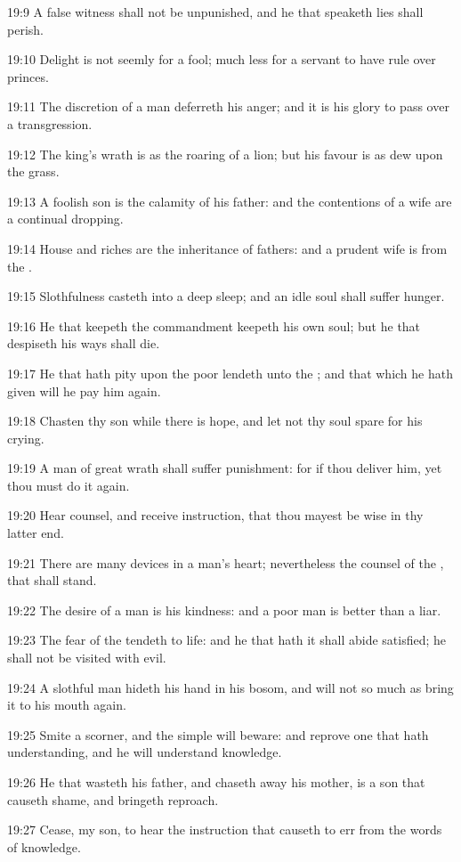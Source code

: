 19:9 A false witness shall not be unpunished, and he that speaketh
lies shall perish.

19:10 Delight is not seemly for a fool; much less for a servant to
have rule over princes.

19:11 The discretion of a man deferreth his anger; and it is his glory
to pass over a transgression.

19:12 The king's wrath is as the roaring of a lion; but his favour is
as dew upon the grass.

19:13 A foolish son is the calamity of his father: and the contentions
of a wife are a continual dropping.

19:14 House and riches are the inheritance of fathers: and a prudent
wife is from the \LORD.

19:15 Slothfulness casteth into a deep sleep; and an idle soul shall
suffer hunger.

19:16 He that keepeth the commandment keepeth his own soul; but he
that despiseth his ways shall die.

19:17 He that hath pity upon the poor lendeth unto the \LORD; and that
which he hath given will he pay him again.

19:18 Chasten thy son while there is hope, and let not thy soul spare
for his crying.

19:19 A man of great wrath shall suffer punishment: for if thou
deliver him, yet thou must do it again.

19:20 Hear counsel, and receive instruction, that thou mayest be wise
in thy latter end.

19:21 There are many devices in a man's heart; nevertheless the
counsel of the \LORD, that shall stand.

19:22 The desire of a man is his kindness: and a poor man is better
than a liar.

19:23 The fear of the \LORD tendeth to life: and he that hath it shall
abide satisfied; he shall not be visited with evil.

19:24 A slothful man hideth his hand in his bosom, and will not so
much as bring it to his mouth again.

19:25 Smite a scorner, and the simple will beware: and reprove one
that hath understanding, and he will understand knowledge.

19:26 He that wasteth his father, and chaseth away his mother, is a
son that causeth shame, and bringeth reproach.

19:27 Cease, my son, to hear the instruction that causeth to err from
the words of knowledge.

